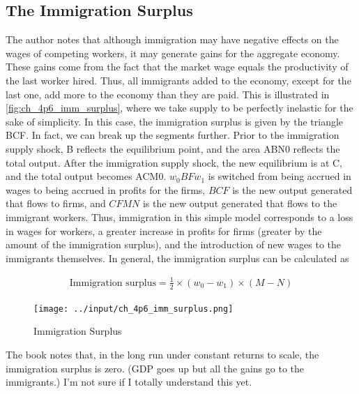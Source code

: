 \subsection{The Immigration Surplus}

The author notes that although immigration 
may have negative effects on the wages of competing workers, 
it may generate gains for the aggregate economy.
These gains come from the fact that the 
market wage equals the productivity of the last worker 
hired. Thus, all immigrants added to the economy, except 
for the last one, add more to the economy than they are paid.
This is illustrated in \autoref{fig:ch_4p6_imm_surplus},
where we take supply to be perfectly inelastic for the 
sake of simplicity.
In this case, the immigration surplus is given by
the triangle BCF. In fact, we can break up the 
segments further. Prior to the immigration supply shock, 
B reflects the equilibrium point, and 
the area ABN0 reflects the total output.
After the immigration supply shock, 
the new equilibrium is at C, and 
the total output becomes ACM0.
$w_0BFw_1$ is switched from 
being accrued in wages to 
being accrued in profits for the firms,
$BCF$ is the new output generated that flows 
to firms, and $CFMN$ is the new output generated that 
flows to the immigrant workers.
Thus, immigration in this simple model corresponds to 
a loss in wages for workers, a greater increase in profits for firms (greater 
by the amount of the immigration surplus),
and the introduction of new wages to the immigrants themselves.
In general, the immigration surplus can be calculated 
as 

\begin{align}
    \text{Immigration surplus} =\frac{1}{2} \times\left(w_0-w_1\right) \times(M-N)
\end{align}


\FloatBarrier

\begin{figure}[!htb]
    \centering
        \texttt{[image: ../input/ch\_4p6\_imm\_surplus.png]}
    \caption{Immigration Surplus}
    \label{fig:ch_4p6_imm_surplus}
\end{figure}

\FloatBarrier

\begin{questions}
    
    The book notes that, in the long run under 
    constant returns to scale, 
    the immigration surplus is zero. (GDP goes up but all the gains
    go to the immigrants.) I'm not sure if 
    I totally understand this yet.

\end{questions}

